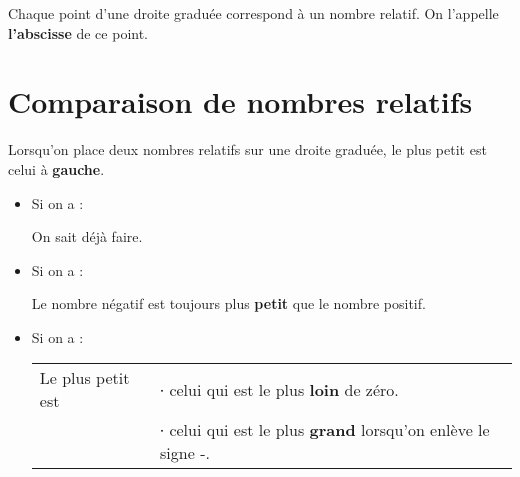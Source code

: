 \documentclass[../€Cours-complet/Cours-complet]{subfiles}
\begin{document}
\newpage

\begin{cours}
	Chaque point d'une droite graduée correspond à un nombre relatif. On l'appelle \textbf{l'abscisse} de ce point.
\end{cours}

\section{Comparaison de nombres relatifs}

\begin{cours}
	Lorsqu'on place deux nombres relatifs sur une droite graduée, le plus petit est celui à \textbf{gauche}.
\end{cours}

\begin{exemple}
	 \hspace{2em}
\end{exemple}

\begin{methode}
	\begin{itemize}
		\item Si on a  :

		      On sait déjà faire.
		\item Si on a  :

		      Le nombre négatif est toujours plus \textbf{petit} que le nombre positif.
		\item Si on a  :

		      \begin{tabular}{ll}
			      Le plus petit est & ∙ celui qui est le plus \textbf{loin} de zéro.                      \\
			                        & ∙ celui qui est le plus \textbf{grand} lorsqu'on enlève le signe -.
		      \end{tabular}
	\end{itemize}
\end{methode}
\end{document}
